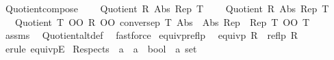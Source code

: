 \begin{isabellebody}
{\isafoldproof}%
%
\isadelimproof
%
\endisadelimproof
%
\isadelimdocument
%
\endisadelimdocument
%
\isatagdocument
%
\isamarkuptrue%
%
\endisatagdocument
{\isafolddocument}%
%
\isadelimdocument
%
\endisadelimdocument
{}\isamarkupfalse%
\ Quotient{\isacharunderscore}{\kern0pt}compose{\isacharcolon}{\kern0pt}\isanewline
\ \ \ {}{\isacharcolon}{\kern0pt}\ {\isachardoublequoteopen}Quotient\ R{}\ Abs{}\ Rep{}\ T{}{\isachardoublequoteclose}\isanewline
\ \ \ {}{\isacharcolon}{\kern0pt}\ {\isachardoublequoteopen}Quotient\ R{}\ Abs{}\ Rep{}\ T{}{\isachardoublequoteclose}\isanewline
\ \ \ {\isachardoublequoteopen}Quotient\ {\isacharparenleft}{\kern0pt}T{}\ OO\ R{}\ OO\ conversep\ T{}{\isacharparenright}{\kern0pt}\ {\isacharparenleft}{\kern0pt}Abs{}\ {\isasymcirc}\ Abs{}{\isacharparenright}{\kern0pt}\ {\isacharparenleft}{\kern0pt}Rep{}\ {\isasymcirc}\ Rep{}{\isacharparenright}{\kern0pt}\ {\isacharparenleft}{\kern0pt}T{}\ OO\ T{}{\isacharparenright}{\kern0pt}{\isachardoublequoteclose}\isanewline
%
\isadelimproof
\ \ %
\endisadelimproof
%
\isatagproof
{}\isamarkupfalse%
\ assms\ \isamarkupfalse%
\ Quotient{\isacharunderscore}{\kern0pt}alt{\isacharunderscore}{\kern0pt}def{}\ \isamarkupfalse%
\ fastforce%
\endisatagproof
{\isafoldproof}%
%
\isadelimproof
\isanewline
%
\endisadelimproof
\isanewline
{}\isamarkupfalse%
\ equivp{\isacharunderscore}{\kern0pt}reflp{}{\isacharcolon}{\kern0pt}\isanewline
\ \ {\isachardoublequoteopen}equivp\ R\ {\isasymLongrightarrow}\ reflp\ R{\isachardoublequoteclose}\isanewline
%
\isadelimproof
\ \ %
\endisadelimproof
%
\isatagproof
{}\isamarkupfalse%
\ {\isacharparenleft}{\kern0pt}erule\ equivpE{\isacharparenright}{\kern0pt}%
\endisatagproof
{\isafoldproof}%
%
\isadelimproof
%
\endisadelimproof
%
\isadelimdocument
%
\endisadelimdocument
%
\isatagdocument
%
\isamarkuptrue%
%
\endisatagdocument
{\isafolddocument}%
%
\isadelimdocument
%
\endisadelimdocument
{}\isamarkupfalse%
\ Respects\ {\isacharcolon}{\kern0pt}{\isacharcolon}{\kern0pt}\ {\isachardoublequoteopen}{\isacharparenleft}{\kern0pt}{\isacharprime}{\kern0pt}a\ {\isasymRightarrow}\ {\isacharprime}{\kern0pt}a\ {\isasymRightarrow}\ bool{\isacharparenright}{\kern0pt}\ {\isasymRightarrow}\ {\isacharprime}{\kern0pt}a\ set{\isachardoublequoteclose}\isanewline

\end{isabellebody}
